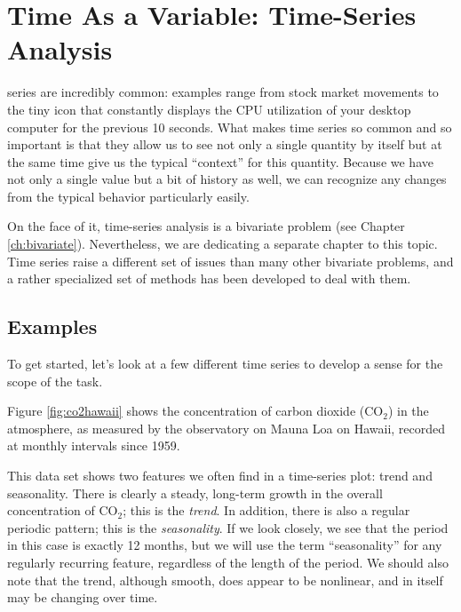 

\chapter{Time As a Variable: Time-Series Analysis}{}{}
\label{ch:timeseries}

 
 series are incredibly common:
examples range from stock market movements to the tiny icon that
constantly displays the CPU utilization of your desktop computer for the
previous 10 seconds. What makes time series so common and so important is
that they allow us to see not only a single quantity by itself but at
the same time give us the typical ``context'' for this quantity. Because
we have not only a single value but a bit of history as well, we can
recognize any changes from the typical behavior particularly easily.

On the face of it, time-series analysis is a bivariate problem (see
Chapter \ref{ch:bivariate}). Nevertheless, we are dedicating a
separate chapter to this topic.  Time series raise a different set of
issues than many other bivariate problems, and a rather specialized
set of methods has been developed to deal with them.

\section{Examples}


To get started, let's look at a few different time series to develop a
sense for the scope of the task.


Figure \ref{fig:co2hawaii} shows the concentration of carbon dioxide
($\mathrm{CO_2}$) in the atmosphere, as measured by the observatory on
Mauna Loa on Hawaii, recorded at monthly intervals since 1959.

This data set shows two features we often find in a time-series plot:
trend and seasonality. There is clearly a steady, long-term growth in
the overall concentration of $\mathrm{CO_2}$; this is the
\emph{trend}.  In addition, there is also a regular periodic pattern;
this is the \emph{seasonality}.   If we look closely, we see that the
period in this\vadjust{\pagebreak} case is exactly 12 months, but we will
use the term ``seasonality'' for any regularly recurring feature,
regardless of the length of the period. We should also note that the
trend, although smooth, does appear to be nonlinear, and in itself may be
changing over time.

